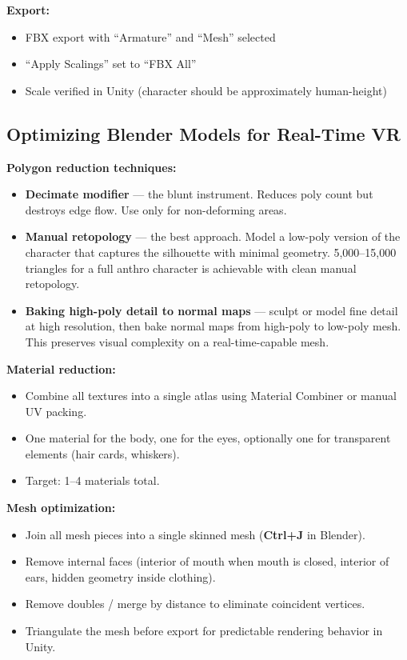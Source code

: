 \begin{furrybox}[title={\sffamily\bfseries\small\textcolor{white}{VRChat Avatar Optimization Checklist}}]
\textbf{Export:}
\begin{itemize}[leftmargin=1.5em]
  \item[$\square$] FBX export with ``Armature'' and ``Mesh'' selected
  \item[$\square$] ``Apply Scalings'' set to ``FBX All''
  \item[$\square$] Scale verified in Unity (character should be approximately human-height)
\end{itemize}
\end{furrybox}


\subsection{Optimizing Blender Models for Real-Time VR}

\textbf{Polygon reduction techniques:}

\begin{itemize}[leftmargin=2em]
  \item \textbf{Decimate modifier} --- the blunt instrument. Reduces poly count but destroys edge flow. Use only for non-deforming areas.
  \item \textbf{Manual retopology} --- the best approach. Model a low-poly version of the character that captures the silhouette with minimal geometry. 5,000--15,000 triangles for a full anthro character is achievable with clean manual retopology.
  \item \textbf{Baking high-poly detail to normal maps} --- sculpt or model fine detail at high resolution, then bake normal maps from high-poly to low-poly mesh. This preserves visual complexity on a real-time-capable mesh.
\end{itemize}

\textbf{Material reduction:}
\begin{itemize}[leftmargin=2em]
  \item Combine all textures into a single atlas using Material Combiner or manual UV packing.
  \item One material for the body, one for the eyes, optionally one for transparent elements (hair cards, whiskers).
  \item Target: 1--4 materials total.
\end{itemize}

\textbf{Mesh optimization:}
\begin{itemize}[leftmargin=2em]
  \item Join all mesh pieces into a single skinned mesh (\textbf{Ctrl+J} in Blender).
  \item Remove internal faces (interior of mouth when mouth is closed, interior of ears, hidden geometry inside clothing).
  \item Remove doubles / merge by distance to eliminate coincident vertices.
  \item Triangulate the mesh before export for predictable rendering behavior in Unity.
\end{itemize}


